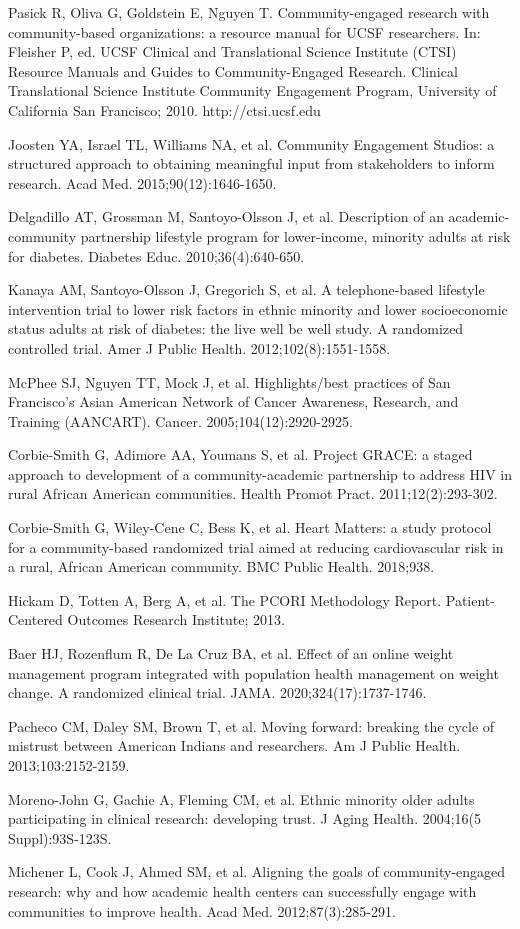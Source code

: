 \begin{references}
\item Pasick R, Oliva G, Goldstein E, Nguyen T. Community-engaged research with community-based organizations: a resource manual for UCSF researchers. In: Fleisher P, ed. UCSF Clinical and Translational Science Institute (CTSI) Resource Manuals and Guides to Community-Engaged Research. Clinical Translational Science Institute Community Engagement Program, University of California San Francisco; 2010. http://ctsi.ucsf.edu
\item Joosten YA, Israel TL, Williams NA, et al. Community Engagement Studios: a structured approach to obtaining meaningful input from stakeholders to inform research. Acad Med. 2015;90(12):1646-1650.
\item Delgadillo AT, Grossman M, Santoyo-Olsson J, et al. Description of an academic-community partnership lifestyle program for lower-income, minority adults at risk for diabetes. Diabetes Educ. 2010;36(4):640-650.
\item Kanaya AM, Santoyo-Olsson J, Gregorich S, et al. A telephone-based lifestyle intervention trial to lower risk factors in ethnic minority and lower socioeconomic status adults at risk of diabetes: the live well be well study. A randomized controlled trial. Amer J Public Health. 2012;102(8):1551-1558.
\item McPhee SJ, Nguyen TT, Mock J, et al. Highlights/best practices of San Francisco’s Asian American Network of Cancer Awareness, Research, and Training (AANCART). Cancer. 2005;104(12):2920-2925.
\item Corbie-Smith G, Adimore AA, Youmans S, et al. Project GRACE: a staged approach to development of a community-academic partnership to address HIV in rural African American communities. Health Promot Pract. 2011;12(2):293-302.
\item Corbie-Smith G, Wiley-Cene C, Bess K, et al. Heart Matters: a study protocol for a community-based randomized trial aimed at reducing cardiovascular risk in a rural, African American community. BMC Public Health. 2018;938.
\item Hickam D, Totten A, Berg A, et al. The PCORI Methodology Report. Patient-Centered Outcomes Research Institute; 2013.
\item Baer HJ, Rozenflum R, De La Cruz BA, et al. Effect of an online weight management program integrated with population health management on weight change. A randomized clinical trial. JAMA. 2020;324(17):1737-1746.
\item Pacheco CM, Daley SM, Brown T, et al. Moving forward: breaking the cycle of mistrust between American Indians and researchers. Am J Public Health. 2013;103:2152-2159.
\item Moreno-John G, Gachie A, Fleming CM, et al. Ethnic minority older adults participating in clinical research: developing trust. J Aging Health. 2004;16(5 Suppl):93S-123S.
\item Michener L, Cook J, Ahmed SM, et al. Aligning the goals of community-engaged research: why and how academic health centers can successfully engage with communities to improve health. Acad Med. 2012;87(3):285-291.
\end{references}

